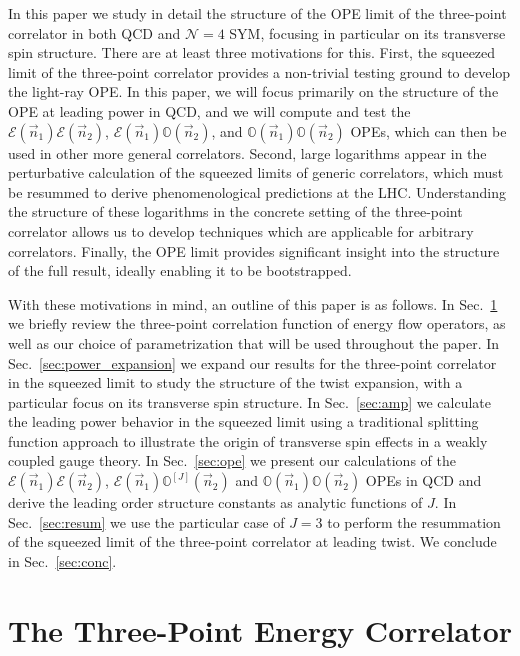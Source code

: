 \documentclass[letterpaper,11pt]{article}
\def\cN{\mathcal{N}}
\DeclareRobustCommand{\Sec}[1]{Sec.~\ref{#1}}
\begin{document}
In this paper we study in detail the structure of the OPE limit of the three-point correlator in both QCD and $\cN=4$ SYM, focusing in particular on its transverse spin structure. There are at least three motivations for this. First, the squeezed limit of the three-point correlator provides a non-trivial testing ground to develop the light-ray OPE. In this paper, we will focus primarily on the structure of the OPE at leading power in QCD, and we will compute and test  the $\mathcal{E}(\vec n_1) \mathcal{E}(\vec n_2)$, $\mathcal{E}(\vec n_1) \mathbb{O}(\vec n_2)$, and $\mathbb{O}(\vec n_1) \mathbb{O}(\vec n_2)$ OPEs, which can then be used in other more general correlators. Second,  large logarithms appear in the perturbative calculation of the squeezed limits of generic correlators, which must be resummed to derive phenomenological predictions at the LHC. Understanding the structure of these logarithms in the concrete setting of the three-point correlator allows us to develop techniques which are applicable for arbitrary correlators. Finally, the OPE limit provides significant insight into the structure of the full result, ideally enabling it to be bootstrapped. 



With these motivations in mind, an outline of this paper is as follows. In \Sec{sec:param} we briefly review the three-point correlation function of energy flow operators, as well as our choice of parametrization that will be used throughout the paper. In \Sec{sec:power_expansion} we expand our results for the three-point correlator in the squeezed limit to study the structure of the twist expansion, with a particular focus on its transverse spin structure. In \Sec{sec:amp} we calculate the leading power behavior in the squeezed limit using a traditional splitting function approach to illustrate the origin of transverse spin effects in a weakly coupled gauge theory.  In \Sec{sec:ope} we present our calculations of the $\mathcal{E}(\vec n_1) \mathcal{E}(\vec n_2)$, $\mathcal{E}(\vec n_1) \mathbb{O}^{[J]}(\vec n_2) $ and $ \mathbb{O}(\vec n_1) \mathbb{O}(\vec n_2)$ OPEs in QCD and derive the leading order structure constants as analytic functions of $J$. In \Sec{sec:resum} we use the particular case of $J=3$ to perform the resummation of the squeezed limit of the three-point correlator at leading twist. We conclude in \Sec{sec:conc}.

\section{The Three-Point Energy Correlator}\label{sec:param}
\end{document}
